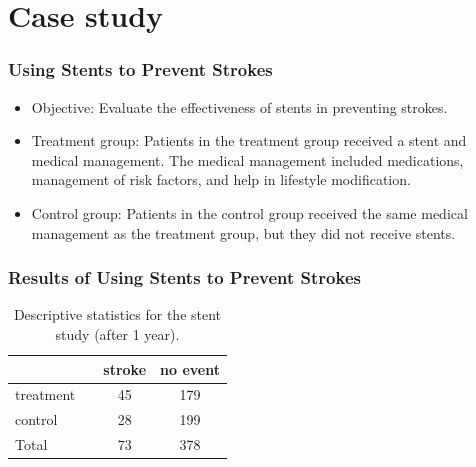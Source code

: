 
\section{Case study}



\begin{frame}
\frametitle{Using Stents to Prevent Strokes}

\begin{itemize}
\item Objective: Evaluate the effectiveness of stents in preventing strokes.

\item Treatment group: Patients in the treatment group received a stent and medical management. The medical management included medications, management of risk factors, and help in lifestyle modification.
\item Control group: Patients in the control group received the same medical management as the treatment group, but they did not receive stents.
\end{itemize}

\end{frame}

\begin{frame}
\frametitle{Results of Using Stents to Prevent Strokes}
\begin{table}[h]
\centering
\begin{tabular}{l c cc}
	&& 	stroke 	& no event \\
  \hline
treatment 	&&	45 	& 179 \\
control 		&& 	28	& 199 \\
  \hline
Total		&&	73	& 378 \\
  \hline
\end{tabular}
\caption{Descriptive statistics for the stent study (after 1 year).}
\label{stentStudyResults}
\end{table}

\pause
{}

\pause
{}

\end{frame}

